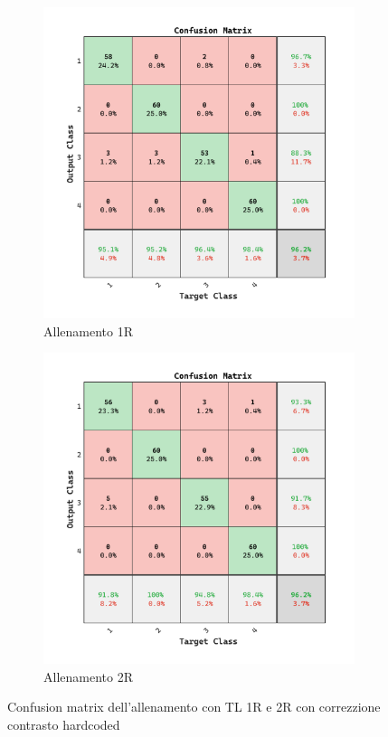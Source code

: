 \begin{figure}[ht]
    \centering
    \begin{subfigure}{0.45\textwidth}
        \includegraphics[width=\textwidth]{addestramento-rete-neurale/one-contrast.pdf}
        \caption{Allenamento 1R} 
    \end{subfigure}
    \begin{subfigure}{0.45\textwidth}
        \includegraphics[width=\textwidth]{addestramento-rete-neurale/two-contrast.pdf}
        \caption{Allenamento 2R} 
    \end{subfigure}
    \caption{Confusion matrix dell'allenamento con TL 1R e 2R con correzzione contrasto hardcoded}
    \label{fig:contrast}
\end{figure}

